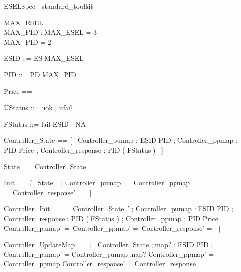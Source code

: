 \documentclass{article}
\begin{document}
\begin{zsection}
    \SECTION ESELSpec\ \parents\ standard\_toolkit
\end{zsection}

\begin{axdef}
	MAX\_ESEL : \nat \\
 MAX\_PID : \nat 
\where
 MAX\_ESEL = 3 \\
 MAX\_PID = 2
\end{axdef}

\begin{zed}
	ESID ::= ES  \upto MAX\_ESEL \rdata
\end{zed}

\begin{zed}
	PID ::= PD  \upto MAX\_PID \rdata
\end{zed}

\begin{zed}
	Price == \nat
\end{zed}

\begin{zed}
	UStatus ::= uok | ufail
\end{zed}

\begin{zed}
	FStatus ::= fail \ldata ESID \rdata | NA
\end{zed}

\begin{zed}
	Controller\_State == [~  Controller\_pumap : ESID \pfun PID ; Controller\_ppmap : PID \pfun Price ; Controller\_response : PID \pfun ( \power FStatus )  ~]
\end{zed}

\begin{zed}
	State == Controller\_State
\end{zed}

\begin{zed}
	Init == [~  State~' | Controller\_pumap' =~\emptyset \land Controller\_ppmap' =~\emptyset \land Controller\_response' =~\emptyset  ~]
\end{zed}

\begin{zed}
	Controller\_Init == [~  Controller\_State~' ; Controller\_pumap : ESID \pfun PID ; Controller\_response : PID \pfun ( \power FStatus ) ; Controller\_ppmap : PID \pfun Price | Controller\_pumap' =~\emptyset \land Controller\_ppmap' =~\emptyset \land Controller\_response' =~\emptyset  ~]
\end{zed}

\begin{zed}
	Controller\_UpdateMap == [~  \Delta Controller\_State ; map? : ESID \pfun PID | Controller\_pumap' = Controller\_pumap \oplus map? \land Controller\_ppmap' = Controller\_ppmap \land Controller\_response' = Controller\_response  ~]
\end{zed}
\end{document}
